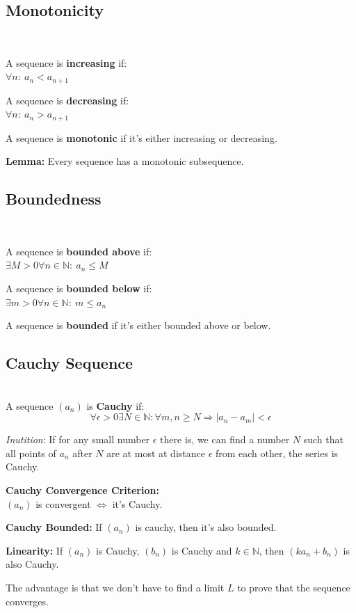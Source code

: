 \documentclass[8pt,a4paper]{extarticle}     %
\theoremstyle{definition}
\theoremstyle{definition}
\theoremstyle{definition}
\newcommand{\N}{\mathbb{N}}
\begin{document}
\begin{multicols}{4}
\subsection{Monotonicity}
\begin{boxdefinition} \
	\begin{bulletlist}
		\item A sequence is \textbf{increasing} if: \\
		$\forall n:\ a_n < a_{n+1}$
		\item A sequence is \textbf{decreasing} if: \\
		$\forall n:\ a_n > a_{n+1}$
		\item A sequence is \textbf{monotonic} if it's either increasing or decreasing.
	\end{bulletlist}
\end{boxdefinition}
\textbf{Lemma: } Every sequence has a monotonic subsequence.

\subsection{Boundedness}
\begin{boxdefinition} \
	\begin{bulletlist}
		\item A sequence is \textbf{bounded above} if: \\
		$\exists M>0\forall n\in\N:\ a_n \leq M$
		\item A sequence is \textbf{bounded below} if: \\
		$\exists m>0\forall n\in\N:\ m \leq a_n$
		\item A sequence is \textbf{bounded} if it's either bounded above or below.
	\end{bulletlist}
\end{boxdefinition}

\subsection{Cauchy Sequence}
\begin{boxdefinition}\ \\
	A sequence $(a_n)$ is \textbf{Cauchy} if:
	$$\forall\epsilon >0\exists N\in\N: \forall m,n\geq N \Rightarrow |a_n-a_m| < \epsilon $$
\end{boxdefinition}
\textit{Inutition}: If for any small number $\epsilon$ there is, we can find a number $N$ such that all points of $a_n$ after $N$ are at most at distance $\epsilon$ from each other, the series is Cauchy.
\begin{eqlist}
	\item \textbf{Cauchy Convergence Criterion:} \\ $(a_n)$ is convergent $\Leftrightarrow$ it's Cauchy.
	\item \textbf{Cauchy Bounded:} If $(a_n)$ is cauchy, then it's also bounded.
	\item \textbf{Linearity:} If $(a_n)$ is Cauchy, $(b_n)$ is Cauchy and $k\in\N$, then $(ka_n+b_n)$ is also Cauchy.
\end{eqlist}
The advantage is that we don't have to find a limit $L$ to prove that the sequence converges.


\end{multicols}
\end{document}
